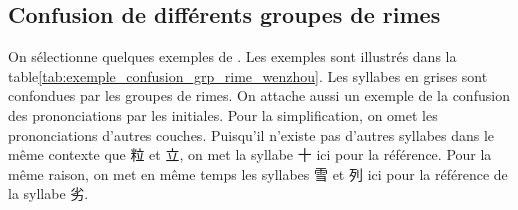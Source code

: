 \documentclass{scrbook}
\newcounter{c}[subsubsection]
\newcommand{\illustre}{Les exemples sont illustrés dans la table\xspace}
\begin{document}
\begin{sloppypar}
\subsection{Confusion de différents groupes de rimes}
On sélectionne quelques exemples de \textcite{Wu2005wenzhou, Wu2006wenzhou}. \illustre \ref{tab:exemple_confusion_grp_rime_wenzhou}. Les syllabes en grises sont confondues par les groupes de rimes. On attache aussi un exemple de la confusion des prononciations par les initiales. Pour la simplification, on omet les prononciations d'autres couches. Puisqu'il n'existe pas d'autres syllabes dans le même contexte que 粒 et 立, on met la syllabe 十 ici pour la référence. Pour la même raison, on met en même temps les syllabes 雪 et 列 ici pour la référence de la syllabe 劣.

\begin{table}[htbp]
  \centering
    \begin{tabular}{lllllll}
    \toprule


\end{tabular}
\end{table}
\end{sloppypar}
\end{document}
